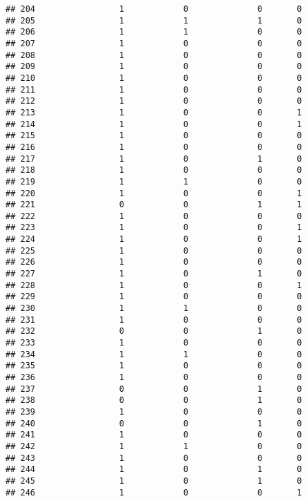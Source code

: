 \documentclass[]{article}
\begin{document}
\begin{verbatim}
## 204                 1            0              0       0
## 205                 1            1              1       0
## 206                 1            1              0       0
## 207                 1            0              0       0
## 208                 1            0              0       0
## 209                 1            0              0       0
## 210                 1            0              0       0
## 211                 1            0              0       0
## 212                 1            0              0       0
## 213                 1            0              0       1
## 214                 1            0              0       1
## 215                 1            0              0       0
## 216                 1            0              0       0
## 217                 1            0              1       0
## 218                 1            0              0       0
## 219                 1            1              0       0
## 220                 1            0              0       1
## 221                 0            0              1       1
## 222                 1            0              0       0
## 223                 1            0              0       1
## 224                 1            0              0       1
## 225                 1            0              0       0
## 226                 1            0              0       0
## 227                 1            0              1       0
## 228                 1            0              0       1
## 229                 1            0              0       0
## 230                 1            1              0       0
## 231                 1            0              0       0
## 232                 0            0              1       0
## 233                 1            0              0       0
## 234                 1            1              0       0
## 235                 1            0              0       0
## 236                 1            0              0       0
## 237                 0            0              1       0
## 238                 0            0              1       0
## 239                 1            0              0       0
## 240                 0            0              1       0
## 241                 1            0              0       0
## 242                 1            1              0       0
## 243                 1            0              0       0
## 244                 1            0              1       0
## 245                 1            0              1       0
## 246                 1            0              0       1

\end{verbatim}
\end{document}
